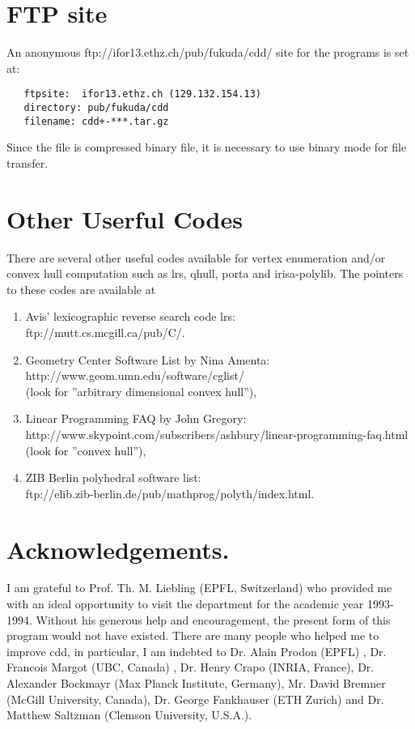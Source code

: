 \documentclass[11pt]{article}
\begin{document}
\section{FTP site}  \label{FTP}
An anonymous 
{ftp://ifor13.ethz.ch/pub/fukuda/cdd/} site for the programs is set at:
\begin{verbatim}
   ftpsite:  ifor13.ethz.ch (129.132.154.13)
   directory: pub/fukuda/cdd
   filename: cdd+-***.tar.gz
\end{verbatim}
Since the file is compressed binary file, it is necessary to use binary mode for
file transfer.

\section{Other Userful Codes}  \label{CODES}
There are several other useful codes available for vertex enumeration and/or
convex hull computation  such as lrs, qhull, porta and irisa-polylib.
The pointers to these codes are available at
\begin{enumerate}
 \item  Avis'  lexicographic reverse search code lrs:\\
 {ftp://mutt.cs.mcgill.ca/pub/C/}.
 \item Geometry Center Software List by Nina Amenta:\\
{http://www.geom.umn.edu/software/cglist/}\\
   (look for ''arbitrary dimensional convex hull''),
 \item Linear Programming FAQ by John Gregory:\\
{http://www.skypoint.com/subscribers/ashbury/linear-programming-faq.html}\\
 (look for ''convex hull''),
 \item ZIB Berlin polyhedral software list:\\
{ftp://elib.zib-berlin.de/pub/mathprog/polyth/index.html}.
\end{enumerate}


\section*{Acknowledgements.} 
I am  grateful to Prof. Th. M. Liebling (EPFL, Switzerland)  who
provided me with an ideal opportunity to visit the department
for the academic year 1993-1994.  Without his 
generous help and encouragement,
the present form of this program would not have existed.
There are many people who helped me to improve cdd,  in particular,
I am indebted to Dr. Alain Prodon (EPFL) , Dr. Francois Margot
(UBC, Canada) , Dr. Henry Crapo (INRIA, France),
Dr. Alexander Bockmayr (Max Planck Institute, Germany), 
Mr. David Bremner (McGill University, Canada),
Dr. George Fankhauser (ETH Zurich) and
Dr.  Matthew Saltzman (Clemson University, U.S.A.). 
\end{document}
